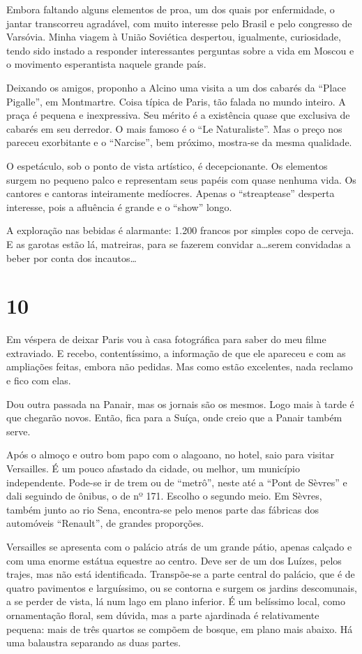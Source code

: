 Embora faltando alguns elementos de proa, um dos quais por enfermidade, o jantar transcorreu agradável, com muito interesse pelo Brasil e pelo congresso de Varsóvia. Minha viagem à União Soviética despertou, igualmente, curiosidade, tendo sido instado a responder interessantes perguntas sobre a vida em Moscou e o movimento esperantista naquele grande país.

Deixando os amigos, proponho a Alcino uma visita a um dos cabarés da ``Place Pigalle'', em Montmartre. Coisa típica de Paris, tão falada no mundo inteiro. A praça é pequena e inexpressiva. Seu mérito é a existência quase que exclusiva de cabarés em seu derredor. O mais famoso é o ``Le Naturaliste''. Mas o preço nos pareceu exorbitante e o ``Narcise'', bem próximo, mostra-se da mesma qualidade.

O espetáculo, sob o ponto de vista artístico, é decepcionante. Os elementos surgem no pequeno palco e representam seus papéis com quase nenhuma vida. Os cantores e cantoras inteiramente medíocres. Apenas o ``streaptease'' desperta interesse, pois a afluência é grande e o ``show'' longo.

A exploração nas bebidas é alarmante: 1.200 francos por simples copo de cerveja. E as garotas estão lá, matreiras, para se fazerem convidar a\ldots serem convidadas a beber por conta dos incautos\ldots

\section*{10 \adfflatleafright {}}
Em véspera de deixar Paris vou à casa fotográfica para saber do meu filme extraviado. E recebo, contentíssimo, a informação de que ele apareceu e com as ampliações feitas, embora não pedidas. Mas como estão excelentes, nada reclamo e fico com elas.

Dou outra passada na Panair, mas os jornais são os mesmos. Logo mais à tarde é que chegarão novos. Então, fica para a Suíça, onde creio que a Panair também serve.

Após o almoço e outro bom papo com o alagoano, no hotel, saio para visitar Versailles. É um pouco afastado da cidade, ou melhor, um município independente. Pode-se ir de trem ou de ``metrô'', neste até a ``Pont de Sèvres'' e dali seguindo de ônibus, o de nº 171. Escolho o segundo meio. Em Sèvres, também junto ao rio Sena, encontra-se pelo menos parte das fábricas dos automóveis ``Renault'', de grandes proporções.

Versailles se apresenta com o palácio atrás de um grande pátio, apenas calçado e com uma enorme estátua equestre ao centro. Deve ser de um dos Luízes, pelos trajes, mas não está identificada. Transpõe-se a parte central do palácio, que é de quatro pavimentos e larguíssimo, ou se contorna e surgem os jardins descomunais, a se perder de vista, lá num lago em plano inferior. É um belíssimo local, como ornamentação floral, sem dúvida, mas a parte ajardinada é relativamente pequena: mais de três quartos se compõem de bosque, em plano mais abaixo. Há uma balaustra separando as duas partes.

